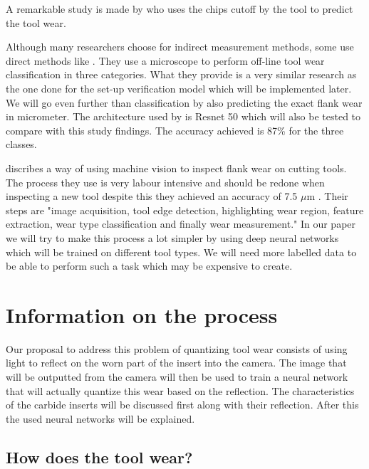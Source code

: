 		A remarkable study is made by \cite{Pagani2020} who uses the chips cutoff by the tool to predict the tool wear. 
           
           
           Although many researchers choose for indirect measurement methods, some use direct methods like \cite{Ambadekar2020}. They use a microscope to perform off-line tool wear classification in three categories. What they provide is a very similar research as the one done for the set-up verification model which will be implemented later. We will go even further than classification by also predicting the exact flank wear in micrometer. The architecture used by \citeauthor{Ambadekar2020} is Resnet 50 which will also be tested to compare with this study findings. The accuracy achieved is 87\% for the three classes.
           
                 \cite{Schmitt2012} discribes a way of using machine vision to inspect flank wear on cutting tools. The process they use is very labour intensive and should be redone when inspecting a new tool despite this they achieved an accuracy of 7.5 $\mu$m . Their steps are "image acquisition, tool edge detection, highlighting wear region, feature extraction, wear type classification and finally wear measurement." In our paper we will try to make this process a lot simpler by using deep neural networks which will be trained on different tool types. We will need more labelled data to be able to perform such a task which may be expensive to create.
         

            
\section{Information on the process}
\label{sec:lit:reflection}

Our proposal to address this problem of quantizing tool wear consists of using light to reflect on the worn part of the insert into the camera. The image that will be outputted from the camera will then be used to train a neural network that will actually quantize this wear based on the reflection. The characteristics of the carbide inserts will be discussed first along with their reflection. After this the used neural networks will be explained.

\subsection{How does the tool wear?}
	
